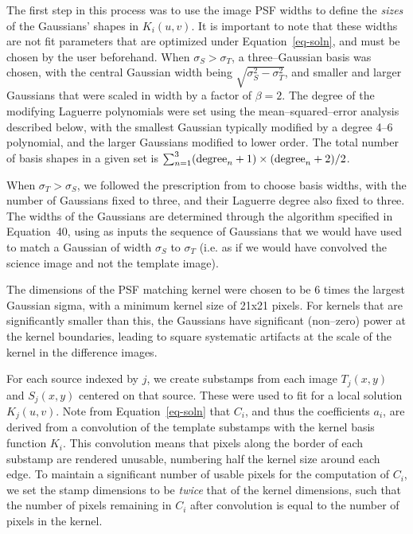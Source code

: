 \documentclass[iop]{emulateapj}
\begin{document}
The first step in this process was to use the image PSF widths to define the {\it sizes} of the Gaussians' shapes in $K_i(u,v)$.
It is important to note that these widths are not fit parameters that are optimized under Equation~\ref{eq-soln}, and must be chosen by the user beforehand.
When $\sigma_S > \sigma_T$, a three--Gaussian basis was chosen, with the central Gaussian width being $\sqrt{\sigma_S^2 - \sigma_T^2}$, and smaller and larger Gaussians that were scaled in width by a factor of $\beta = 2$.
The degree of the modifying Laguerre polynomials were set using the mean--squared--error analysis described below, with the smallest Gaussian typically modified by a degree 4--6 polynomial, and the larger Gaussians modified to lower order.
The total number of basis shapes in a given set is $\sum_{n=1}^{3} ({\rm degree}_n+1)\times({\rm degree}_n+2)/2$.

When $\sigma_T > \sigma_S$, we followed the prescription from \cite{0266-5611-26-8-085002} to choose basis widths, with the number of Gaussians fixed to three, and their Laguerre degree also fixed to three.
The widths of the Gaussians are determined through the algorithm specified in \cite{0266-5611-26-8-085002} Equation~40, using as inputs the sequence of Gaussians that we would have used to match a Gaussian of width $\sigma_S$ to $\sigma_T$ (i.e. as if we would have convolved the science image and not the template image).

The dimensions of the PSF matching kernel were chosen to be 6 times the largest Gaussian sigma, with a minimum kernel size of 21x21 pixels.
For kernels that are significantly smaller than this, the Gaussians have significant (non--zero) power at the kernel boundaries, leading to square systematic artifacts at the scale of the kernel in the difference images.

For each source indexed by $j$, we create substamps from each image $T_j(x,y)$ and $S_j(x,y)$ centered on that source.
These were used to fit for a local solution $K_j(u,v)$.
Note from Equation~\ref{eq-soln} that $C_i$, and thus the coefficients $a_i$, are derived from a convolution of the template substamps with the kernel basis function $K_i$.
This convolution means that pixels along the border of each substamp are rendered unusable, numbering half the kernel size around each edge.
To maintain a significant number of usable pixels for the computation of $C_i$, we set the stamp dimensions to be {\it twice} that of the kernel dimensions, such that the number of pixels remaining in $C_i$ after convolution is equal to the number of pixels in the kernel.
\end{document}
